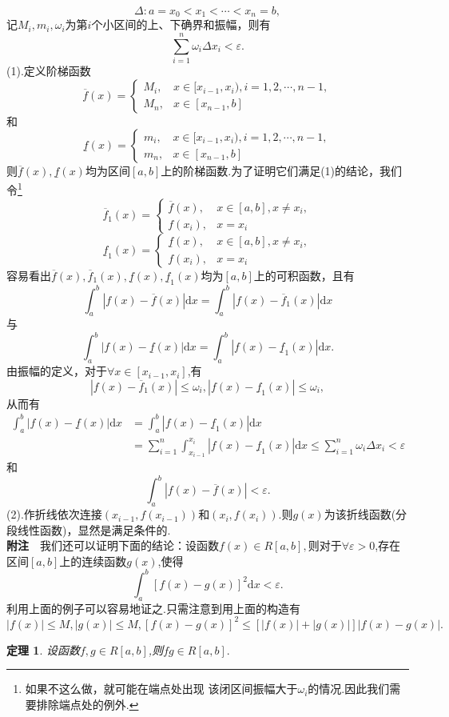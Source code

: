 \documentclass[UTF8]{article}
\newcommand{\dx}{\mathrm{d}x}
\newcommand{\fz}{\textbf{附注}$\quad$}
\newtheorem{thm}{\hspace{2em}定理}[section]
\begin{document}
$$\Delta:a=x_0<x_1<\cdots<x_n=b,$$记$M_i,m_i,\omega_i$为第$i$个小区间的上、下确界和振幅，则有
$$\sum_{i=1}^n\omega_i\Delta x_i<\varepsilon.$$
(1).定义阶梯函数
\[
\overline{f}(x)=
\begin{cases}
  M_i,&x\in[x_{i-1},x_i),i=1,2,\cdots,n-1,\\
  M_n,&x\in[x_{n-1},b]
\end{cases}
\]
和
\[
\underline{f}(x)=
\begin{cases}
  m_i,&x\in[x_{i-1},x_i),i=1,2,\cdots,n-1,\\
  m_n,&x\in[x_{n-1},b]
\end{cases}
\]
则$\overline{f}(x),\underline{f}(x)$均为区间$[a,b]$上的阶梯函数.为了证明它们满足(1)的结论，我们令\footnote{如果不这么做，就可能在端点处出现
该闭区间振幅大于$\omega_i$的情况.因此我们需要排除端点处的例外.}
\[
\overline{f}_1(x)=
\begin{cases}
  \overline{f}(x),&x\in[a,b],x\ne x_i,\\
  f(x_i),&x=x_i
\end{cases}
\]
\[
\underline{f}_1(x)=
\begin{cases}
  \underline{f}(x),&x\in[a,b],x\ne x_i,\\
  f(x_i),&x=x_i
\end{cases}
\]
容易看出$\overline{f}(x),\overline{f}_1(x),\underline{f}(x),\underline{f}_1(x)$均为$[a,b]$上的可积函数，且有
$$\int_a^b|f(x)-\overline{f}(x)|\dx=\int_a^b|f(x)-\overline{f}_1(x)|\dx$$
与$$\int_a^b|f(x)-\underline{f}(x)|\dx=\int_a^b|f(x)-\underline{f}_1(x)|\dx.$$
由振幅的定义，对于$\forall x\in[x_{i-1},x_i]$,有
$$|f(x)-\overline{f}_1(x)|\le \omega_i,|f(x)-\underline{f}_1(x)|\le \omega_i,$$从而有
\begin{align*}
  \int_a^b|f(x)-\underline{f}(x)|\dx&=\int_a^b|f(x)-\underline{f}_1(x)|\dx\\
  &=\sum_{i=1}^n\int_{x_{i-1}}^{x_i}|f(x)-\underline{f}_1(x)|\dx\le\sum_{i=1}^n\omega_i\Delta x_i<\varepsilon
\end{align*}和
$$\int_a^b|f(x)-\overline{f}(x)|<\varepsilon.$$
(2).作折线依次连接$(x_{i-1},f(x_{i-1}))$和$(x_i,f(x_i))$.则$g(x)$为该折线函数(分段线性函数)，显然是满足条件的.\\
\fz 我们还可以证明下面的结论：设函数$f(x)\in R[a,b],$则对于$\forall\varepsilon>0$,存在区间$[a,b]$上的连续函数$g(x)$,使得
$$\int_a^b[f(x)-g(x)]^2\dx<\varepsilon.$$
利用上面的例子可以容易地证之.只需注意到用上面的构造有$|f(x)|\le M,|g(x)|\le M,[f(x)-g(x)]^2\le[|f(x)|+|g(x)|]|f(x)-g(x)|.$
\begin{thm}
  设函数$f,g\in R[a,b]$,则$fg\in R[a,b].$
\end{thm}
\end{document}
